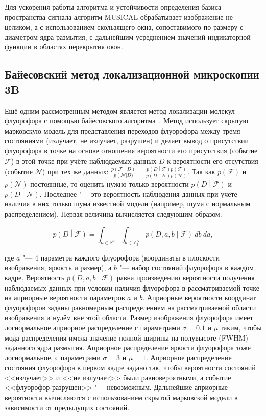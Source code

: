 Для ускорения работы алгоритма и устойчивости определения базиса пространства сигнала алгоритм MUSICAL обрабатывает изображение не целиком, а с использованием скользящего окна, сопоставимого по размеру с диаметром ядра размытия, с дальнейшим усреднением значений индикаторной функции в областях перекрытия окон.

\subsection{Байесовский метод локализационной микроскопии 3B}

Ещё одним рассмотренным методом является метод локализации молекул флуорофора с помощью байесовского алгоритма~\cite{cox2012bayesian}. Метод использует скрытую марковскую модель для представления переходов флуорофора между тремя состояниями (излучает, не излучает, разрушен) и делает вывод о присутствии флуорофора в точке на основе отношения вероятности его присутствия (событие $\mathcal{F}$) в этой точке при учёте наблюдаемых данных $D$ к вероятности его отсутствия (событие $\mathcal{N}$) при тех же данных: $\frac{p\left(\mathcal{F}\middle| D\right)}{p\left(\mathcal{N}\right|D)} = \frac{p\left(D\middle|\mathcal{F}\right)p\left(\mathcal{F}\right)} {p\left(D\middle|\mathcal{N}\right)p\left(\mathcal{N}\right)}$. Так как $p\left(\mathcal{F}\right)$ и $p\left(\mathcal{N}\right)$ постоянные, то оценить нужно только вероятности $p\left(D\middle|\mathcal{F}\right)$ и $p\left(D\middle|\mathcal{N}\right)$. Последнее "--- это вероятность наблюдения данных при учёте наличия в них только шума известной модели (например, шума с нормальным распределением). Первая величина вычисляется следующим образом:

\begin{equation*}
	p\left(D\middle|\mathcal{F}\right)=\int_{a\in\mathbb{R}^4}\int_{b\in\mathbb{Z}_3^N}{p\left(D,a,b\middle|\mathcal{F}\right)\ db\ da},
\end{equation*}

\noindent где $a$ "--- 4 параметра каждого флуорофора (координаты в плоскости изображения, яркость и размер), а $b$ "--- набор состояний флуорофора в каждом кадре. Вероятность $p\left(D,a,b\middle|\mathcal{F}\right)$ равна произведению вероятности получения наблюдаемых данных при условии наличия флуорофора в рассматриваемой точке на априорные вероятности параметров $a$ и $b$. Априорные вероятности координат флуорофоров заданы равномерным распределением на рассматриваемой области изображения и нулём вне этой области. Размер изображения флуорофора имеет логнормальное априорное распределение с параметрами $\sigma=0.1$ и $\mu$ таким, чтобы мода распределения имела значение полной ширины на полувысоте (FWHM) заданного ядра размытия. Априорное распределение яркости флуорофора тоже логнормальное, с параметрами $\sigma=3$ и $\mu=1$. Априорное распределение состояния флуорофора в первом кадре задано так, чтобы вероятности состояний <<излучает>> и <<не излучает>> были равновероятными, а событие <<флуорофор разрушен>> "--- невозможным. Дальнейшие априорные вероятности вычисляются с использованием скрытой марковской модели в зависимости от предыдущих состояний.

